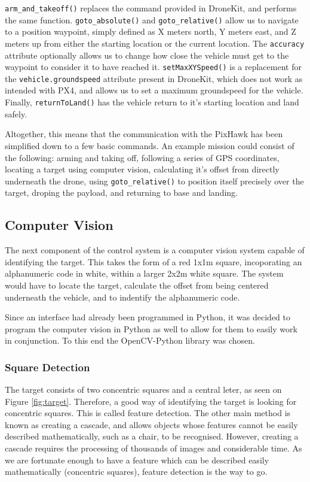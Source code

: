 \documentclass[11pt]{article}
\begin{document}
\lstinline|arm_and_takeoff()| replaces the command provided in DroneKit, and performs the same function. \lstinline|goto_absolute()| and \lstinline|goto_relative()| allow us to navigate to a position waypoint, simply defined as X meters north, Y meters east, and Z meters up from either the starting location or the current location. The \lstinline|accuracy| attribute optionally allows us to change how close the vehicle must get to the waypoint to consider it to have reached it. \lstinline|setMaxXYSpeed()| is a replacement for the \lstinline|vehicle.groundspeed| attribute present in DroneKit, which does not work as intended with PX4, and allows us to set a maximum groundspeed for the vehicle. Finally, \lstinline|returnToLand()| has the vehicle return to it's starting location and land safely.

Altogether, this means that the communication with the PixHawk has been simplified down to a few basic commands. An example mission could consist of the following: arming and taking off, following a series of GPS coordinates, locating a target using computer vision, calculating it's offset from directly underneath the drone, using \lstinline|goto_relative()| to position itself precisely over the target, droping the payload, and returning to base and landing.


\subsection{Computer Vision}
The next component of the control system is a computer vision system capable of identifying the target. This takes the form of a red 1x1m square, incoporating an alphanumeric code in white, within a larger 2x2m white square\cite{IMechE_rules}. The system would have to locate the target, calculate the offset from being centered underneath the vehicle, and to indentify the alphanumeric code.

Since an interface had already been programmed in Python, it was decided to program the computer vision in Python as well to allow for them to easily work in conjunction. To this end the OpenCV-Python library was chosen.

\subsubsection{Square Detection}
The target consists of two concentric squares and a central leter, as seen on Figure \ref{fig:target}\cite{IMechE_rules}. Therefore, a good way of identifying the target is looking for concentric squares. This is called feature detection. The other main method is known as creating a cascade, and allows objects whose features cannot be easily described mathematically, such as a chair, to be recognised. However, creating a cascade requires the processing of thousands of images and considerable time. As we are fortunate enough to have a feature which can be described easily mathematically (concentric squares), feature detection is the way to go.
\end{document}
